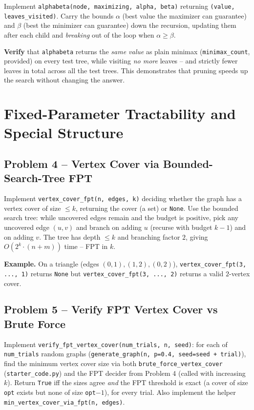 \documentclass[11pt]{article}
\begin{document}
Implement \texttt{alphabeta(node, maximizing, alpha, beta)} returning
\texttt{(value, leaves\_visited)}. Carry the bounds $\alpha$ (best value the
maximizer can guarantee) and $\beta$ (best the minimizer can guarantee) down the
recursion, updating them after each child and \emph{breaking} out of the loop
when $\alpha \ge \beta$.

\textbf{Verify} that \texttt{alphabeta} returns the \emph{same value} as plain
minimax (\texttt{minimax\_count}, provided) on every test tree, while visiting
\emph{no more} leaves -- and strictly fewer leaves in total across all the test
trees. This demonstrates that pruning speeds up the search without changing the
answer.

\newpage
\section{Fixed-Parameter Tractability and Special Structure}

\subsection*{Problem 4 -- Vertex Cover via Bounded-Search-Tree FPT}

Implement \texttt{vertex\_cover\_fpt(n, edges, k)} deciding whether the graph
has a vertex cover of size $\le k$, returning the cover (a set) or \texttt{None}.
Use the bounded search tree: while uncovered edges remain and the budget is
positive, pick any uncovered edge $(u,v)$ and branch on adding $u$ (recurse with
budget $k-1$) and on adding $v$. The tree has depth $\le k$ and branching factor
$2$, giving $O(2^k \cdot (n+m))$ time -- FPT in $k$.

\textbf{Example.} On a triangle (edges $(0,1),(1,2),(0,2)$),
\texttt{vertex\_cover\_fpt(3, ..., 1)} returns \texttt{None} but
\texttt{vertex\_cover\_fpt(3, ..., 2)} returns a valid $2$-vertex cover.

\subsection*{Problem 5 -- Verify FPT Vertex Cover vs Brute Force}

Implement \texttt{verify\_fpt\_vertex\_cover(num\_trials, n, seed)}: for each of
\texttt{num\_trials} random graphs (\texttt{generate\_graph(n, p=0.4, seed=seed
+ trial)}), find the minimum vertex cover size via both
\texttt{brute\_force\_vertex\_cover} (\texttt{starter\_code.py}) and the FPT
decider from Problem 4 (called with increasing $k$). Return \texttt{True} iff
the sizes agree \emph{and} the FPT threshold is exact (a cover of size
\texttt{opt} exists but none of size \texttt{opt}$-1$), for every trial. Also
implement the helper \texttt{min\_vertex\_cover\_via\_fpt(n, edges)}.
\end{document}
